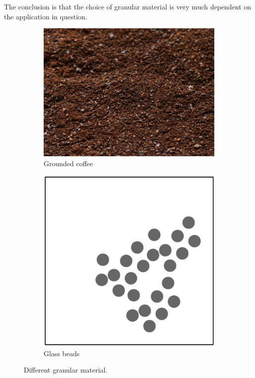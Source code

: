 The conclusion is that the choice of granular material is very much dependent on the application in question. 

\begin{figure}
\centering
\begin{subfigure}{.5\textwidth}
  \centering
  \includegraphics[width=.9\linewidth]{figures/jamming/coffee-grains}
  \caption{Grounded coffee}
\end{subfigure}%
\begin{subfigure}{.5\textwidth}
  \centering
  \includegraphics[width=.9\linewidth]{figures/jamming/glass-beads}
  \caption{Glass beads}
\end{subfigure}
\caption{Different granular material.}
\label{fig:ch:jamming:particles-close-up}
\end{figure}

